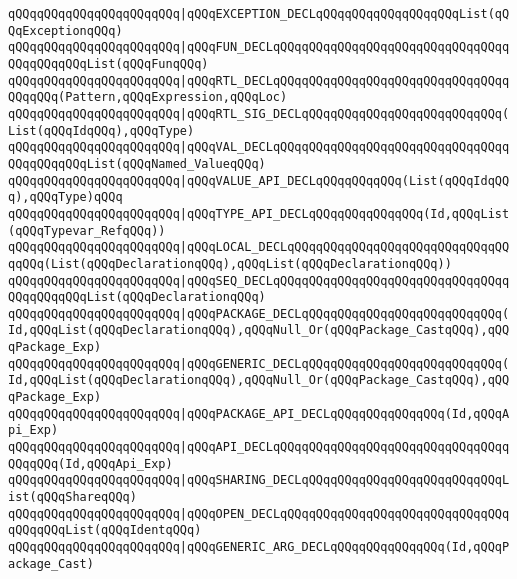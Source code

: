 \verb|qQQqqQQqqQQqqQQqqQQqqQQq|\verb#|qQQqEXCEPTION_DECLqQQqqQQqqQQqqQQqqQQqList(qQQqExceptionqQQq)#\newline
\verb|qQQqqQQqqQQqqQQqqQQqqQQq|\verb#|qQQqFUN_DECLqQQqqQQqqQQqqQQqqQQqqQQqqQQqqQQqqQQqqQQqqQQqList(qQQqFunqQQq)#\newline
\verb|qQQqqQQqqQQqqQQqqQQqqQQq|\verb#|qQQqRTL_DECLqQQqqQQqqQQqqQQqqQQqqQQqqQQqqQQqqQQqqQQq(Pattern,qQQqExpression,qQQqLoc)#\newline
\verb|qQQqqQQqqQQqqQQqqQQqqQQq|\verb#|qQQqRTL_SIG_DECLqQQqqQQqqQQqqQQqqQQqqQQqqQQq(List(qQQqIdqQQq),qQQqType)#\newline
\verb|qQQqqQQqqQQqqQQqqQQqqQQq|\verb#|qQQqVAL_DECLqQQqqQQqqQQqqQQqqQQqqQQqqQQqqQQqqQQqqQQqqQQqList(qQQqNamed_ValueqQQq)#\newline
\verb|qQQqqQQqqQQqqQQqqQQqqQQq|\verb#|qQQqVALUE_API_DECLqQQqqQQqqQQq(List(qQQqIdqQQq),qQQqType)qQQq#\newline
\verb|qQQqqQQqqQQqqQQqqQQqqQQq|\verb#|qQQqTYPE_API_DECLqQQqqQQqqQQqqQQq(Id,qQQqList(qQQqTypevar_RefqQQq))#\newline
\verb|qQQqqQQqqQQqqQQqqQQqqQQq|\verb#|qQQqLOCAL_DECLqQQqqQQqqQQqqQQqqQQqqQQqqQQqqQQqqQQq(List(qQQqDeclarationqQQq),qQQqList(qQQqDeclarationqQQq))#\newline
\verb|qQQqqQQqqQQqqQQqqQQqqQQq|\verb#|qQQqSEQ_DECLqQQqqQQqqQQqqQQqqQQqqQQqqQQqqQQqqQQqqQQqqQQqList(qQQqDeclarationqQQq)#\newline
\verb|qQQqqQQqqQQqqQQqqQQqqQQq|\verb#|qQQqPACKAGE_DECLqQQqqQQqqQQqqQQqqQQqqQQqqQQq(Id,qQQqList(qQQqDeclarationqQQq),qQQqNull_Or(qQQqPackage_CastqQQq),qQQqPackage_Exp)#\newline
\verb|qQQqqQQqqQQqqQQqqQQqqQQq|\verb#|qQQqGENERIC_DECLqQQqqQQqqQQqqQQqqQQqqQQqqQQq(Id,qQQqList(qQQqDeclarationqQQq),qQQqNull_Or(qQQqPackage_CastqQQq),qQQqPackage_Exp)#\newline
\verb|qQQqqQQqqQQqqQQqqQQqqQQq|\verb#|qQQqPACKAGE_API_DECLqQQqqQQqqQQqqQQq(Id,qQQqApi_Exp)#\newline
\verb|qQQqqQQqqQQqqQQqqQQqqQQq|\verb#|qQQqAPI_DECLqQQqqQQqqQQqqQQqqQQqqQQqqQQqqQQqqQQqqQQq(Id,qQQqApi_Exp)#\newline
\verb|qQQqqQQqqQQqqQQqqQQqqQQq|\verb#|qQQqSHARING_DECLqQQqqQQqqQQqqQQqqQQqqQQqqQQqList(qQQqShareqQQq)#\newline
\verb|qQQqqQQqqQQqqQQqqQQqqQQq|\verb#|qQQqOPEN_DECLqQQqqQQqqQQqqQQqqQQqqQQqqQQqqQQqqQQqqQQqList(qQQqIdentqQQq)#\newline
\verb|qQQqqQQqqQQqqQQqqQQqqQQq|\verb#|qQQqGENERIC_ARG_DECLqQQqqQQqqQQqqQQq(Id,qQQqPackage_Cast)#\newline

